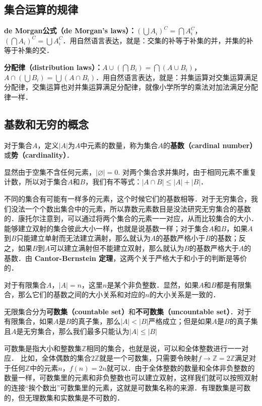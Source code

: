 \subsection{集合运算的规律}

\textbf{de Morgan公式（de Morgan's laws）：}$(\bigcup A_i)^C=\bigcap A_i^C$，$(\bigcap A_i)^C=\bigcup A_i^C$．用自然语言表达，就是：交集的补等于补集的并，并集的补等于补集的交．

\textbf{分配律（distribution laws）：}$A\cup(\bigcap B_i)=\bigcap (A\cup B_i)$，$A\cap(\bigcup B_i)=\bigcup (A\cap B_i)$．用自然语言表达，就是：并集运算对交集运算满足分配律，交集运算也对并集运算满足分配律，就像小学所学的乘法对加法满足分配律一样．

\subsection{基数和无穷的概念}

对于集合$A$，定义$|A|$为$A$中元素的数量，称为集合$A$的\textbf{基数（cardinal number）}或\textbf{势（cardinality）}．

显然由于空集不含任何元素，$|\varnothing|=0$. 对两个集合求并集时，由于相同元素不重复计数，所以对于集合$A$和$B$，我们有不等式：$|A\cap B|\le|A|+|B|$．

不同的集合有可能有一样多的元素，这个时候它们的基数相等．对于无穷集合，我们没法一个个数出集合中的元素，所以靠数元素数目是没法研究无穷集合的基数的．康托尔注意到，可以通过将两个集合的元素一一对应，从而比较集合的大小．能够建立双射的集合彼此大小一样，也就是说基数一样；对于集合$A$和$B$，如果$A$到$B$只能建立单射而无法建立满射，那么就认为$A$的基数严格小于$B$的基数；反之，如果$B$到$A$可以建立满射但不能建立双射，那么就认为$B$的基数严格大于$A$的基数．由 \textbf{Cantor-Bernstein 定理}，这两个关于严格大于和小于的判断是等价的．

对于有限集合$A$，$|A|=n$，这里$n$是某个非负整数．显然，如果$A$和$B$都是有限集合，那么它们的基数之间的大小关系和对应的$n$的大小关系是一致的．

无限集合分为\textbf{可数集（countable set）}和\textbf{不可数集（uncountable set）}．对于有限集合，如果$A$是$B$的真子集，那么$|A|<|B|$严格成立；但是如果$A$是$B$的真子集且$A$是无穷集合，那么我们最多只能认为$|A|\le|B|$

可数集是指大小和整数集$\mathbb{Z}$相同的集合，也就是说，可以和全体整数进行一一对应． 比如，全体偶数的集合$2\mathbb{Z}$就是一个可数集，只需要令映射$f\rightarrow \mathbb{Z}=2\mathbb{Z}$满足对于任何$\mathbb{Z}$中的元素$n$，$f(n)=2n$就可以．由于全体整数的数量和全体非负整数的数量一样，可数集里的元素和非负整数也可以建立双射，这样我们就可以按照双射的连接“挨个数出”可数集里的元素，这就是可数集名称的来源．有理数集是可数的，但无理数集和实数集是不可数的．

